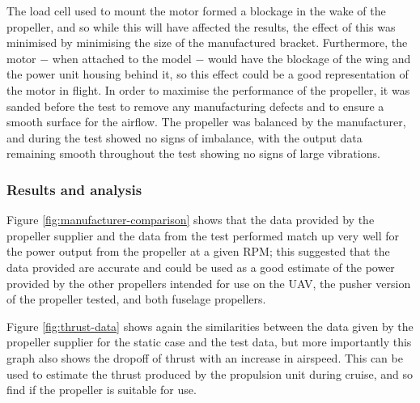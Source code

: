 \documentclass[../../main.tex]{subfiles}
\begin{document}
The load cell used to mount the motor formed a blockage in the wake of the propeller, and so while this will have affected the results, the effect of this was minimised by minimising the size of the manufactured bracket.
Furthermore, the motor $-$ when attached to the model $-$ would have the blockage of the wing and the power unit housing behind it, so this effect could be a good representation of the motor in flight.
In order to maximise the performance of the propeller, it was sanded before the test to remove any manufacturing defects and to ensure a smooth surface for the airflow.
The propeller was balanced by the manufacturer, and during the test showed no signs of imbalance, with the output data remaining smooth throughout the test showing no signs of large vibrations. 

\subsubsection{Results and analysis} \label{sec:design-process:interim-design-review:motor-and-propellor-test:results-and-analysis}


Figure \ref{fig:manufacturer-comparison} shows that the data provided by the propeller supplier and the data from the test performed match up very well for the power output from the propeller at a given RPM; this suggested that the data provided are accurate and could be used as a good estimate of the power provided by the other propellers intended for use on the UAV, the pusher version of the propeller tested, and both fuselage propellers. 


Figure \ref{fig:thrust-data} shows again the similarities between the data given by the propeller supplier for the static case and the test data, but more importantly this graph also shows the dropoff of thrust with an increase in airspeed.
This can be used to estimate the thrust produced by the propulsion unit during cruise, and so find if the propeller is suitable for use.

\end{document}

